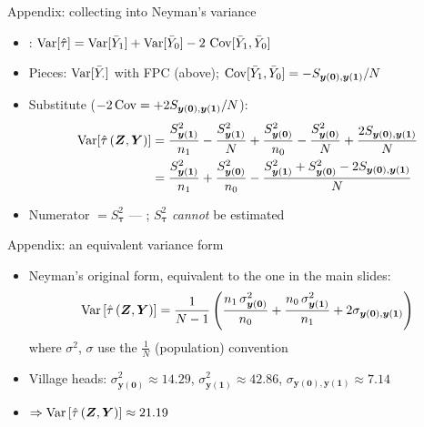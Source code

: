 \documentclass[table, xcolor = {dvipsnames}, 9pt]{beamer}
\theoremstyle{plain}
\newcommand{\mh}[1]{{\color{magenta}{#1}}}
\DeclareMathOperator{\Var}{\rm{Var}}
\DeclareMathOperator{\Cov}{\rm{Cov}}
\begin{document}
\begin{frame}[t]{Appendix: collecting into Neyman's variance}
\small
\begin{itemize} \vfill
\item \mh{Variance of a difference}: $\Var[\hat{\tau}] = \Var[\bar{Y}_1] + \Var[\bar{Y}_0] - 2\,\Cov[\bar{Y}_1, \bar{Y}_0]$ \vfill
\item Pieces: $\Var[\bar{Y}_{\cdot}]$ with FPC (above); $\Cov[\bar{Y}_1, \bar{Y}_0] = -S_{\bm{y}(\bm{0}),\bm{y}(\bm{1})}/N$ \vfill
\item Substitute ($-2\Cov = +2 S_{\bm{y}(\bm{0}),\bm{y}(\bm{1})}/N$): \vfill
\begin{align*}
\Var[\hat{\tau}\left(\bm{Z}, \bm{Y}\right)]
&= \frac{S^2_{\bm{y}(\bm{1})}}{n_1} - \frac{S^2_{\bm{y}(\bm{1})}}{N} + \frac{S^2_{\bm{y}(\bm{0})}}{n_0} - \frac{S^2_{\bm{y}(\bm{0})}}{N} + \frac{2 S_{\bm{y}(\bm{0}),\bm{y}(\bm{1})}}{N} \\
&= \frac{S^2_{\bm{y}(\bm{1})}}{n_1} + \frac{S^2_{\bm{y}(\bm{0})}}{n_0} - \frac{S^2_{\bm{y}(\bm{1})} + S^2_{\bm{y}(\bm{0})} - 2 S_{\bm{y}(\bm{0}),\bm{y}(\bm{1})}}{N}
\end{align*} \vfill
\item Numerator $= S^2_{\bm{\tau}}$ --- \mh{Neyman's variance}; $S^2_{\bm{\tau}}$ \emph{cannot} be estimated \vfill
\end{itemize} \vfill
\end{frame}
\begin{frame}[t]{Appendix: an equivalent variance form}
\vfill
\begin{itemize} \vfill
\item Neyman's \citeyearpar{neyman1923} original form, equivalent to the one in the main slides:
\begin{equation*}
\Var\left[\hat{\tau}\left(\bm{Z}, \bm{Y}\right)\right] = \frac{1}{N - 1}\left(\frac{n_1\, \sigma^2_{\bm{y}(\bm{0})}}{n_0} + \frac{n_0\, \sigma^2_{\bm{y}(\bm{1})}}{n_1} + 2\sigma_{\bm{y}(\bm{0}), \bm{y}(\bm{1})}\right)
\end{equation*}
where $\sigma^2$, $\sigma$ use the $\tfrac{1}{N}$ (population) convention \vfill
\item Village heads: $\sigma^2_{\bm{y}(\bm{0})} \approx 14.29$, $\sigma^2_{\bm{y}(\bm{1})} \approx 42.86$, $\sigma_{\bm{y}(\bm{0}), \bm{y}(\bm{1})} \approx 7.14$ \vfill
\item[] $\Rightarrow \Var\left[\hat{\tau}\left(\bm{Z}, \bm{Y}\right)\right] \approx 21.19$ \vfill
\end{itemize} \vfill
\end{frame}
\end{document}

